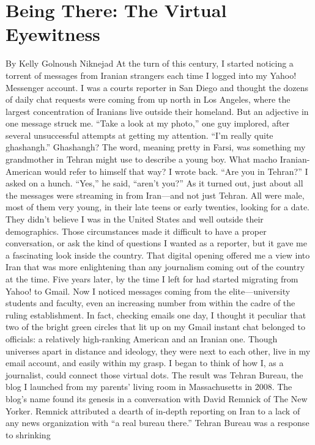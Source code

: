 \chapter{Being There: The Virtual Eyewitness}
By Kelly Golnoush Niknejad
At the turn of this century, I started noticing a torrent of messages from Iranian strangers
each time I logged into my Yahoo! Messenger account. I was a courts reporter in San
Diego and thought the dozens of daily chat requests were coming from up north in Los
Angeles, where the largest concentration of Iranians live outside their homeland. But an
adjective in one message struck me. ``Take a look at my photo,'' one guy implored, after
several unsuccessful attempts at getting my attention. ``I’m really quite ghashangh.''
Ghashangh? The word, meaning pretty in Farsi, was something my grandmother in
Tehran might use to describe a young boy. What macho Iranian-American would refer to
himself that way?
I wrote back. ``Are you in Tehran?'' I asked on a hunch.
``Yes,'' he said, ``aren’t you?''
As it turned out, just about all the messages were streaming in from Iran—and not just
Tehran. All were male, most of them very young, in their late teens or early twenties,
looking for a date. They didn’t believe I was in the United States and well outside their
demographics. Those circumstances made it difficult to have a proper conversation, or
ask the kind of questions I wanted as a reporter, but it gave me a fascinating look inside
the country.
That digital opening offered me a view into Iran that was more enlightening than any
journalism coming out of the country at the time. Five years later, by the time I left for
had started migrating from Yahoo! to Gmail. Now I noticed messages coming from the
elite—university students and faculty, even an increasing number from within the cadre
of the ruling establishment.
In fact, checking emails one day, I thought it peculiar that two of the bright green circles
that lit up on my Gmail instant chat belonged to officials: a relatively high-ranking
American and an Iranian one. Though universes apart in distance and ideology, they were
next to each other, live in my email account, and easily within my grasp. I began to think
of how I, as a journalist, could connect those virtual dots. The result was Tehran Bureau,
the blog I launched from my parents’ living room in Massachusetts in 2008.
The blog’s name found its genesis in a conversation with David Remnick of The New
Yorker. Remnick attributed a dearth of in-depth reporting on Iran to a lack of any news
organization with ``a real bureau there.'' Tehran Bureau was a response to shrinking
